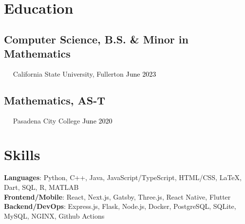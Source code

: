 \documentclass{article}
\newcommand{\resumesection}[3]{
    \subsection*{#1}
    \ 
    \ 
    \small
    \textcolor{csufgrey}{#2}
    \normalsize
    \hfill
    \textcolor{black}{#3}
    \normalsize
}
\begin{document}
\pagestyle{useheader}

\section*{Education}
\resumesection{Computer Science, B.S. \& Minor in Mathematics}{California State University, Fullerton}{June 2023}%
\resumesection{Mathematics, AS-T}{Pasadena City College}{June 2020}
\section*{Skills}
\textbf{Languages}: Python, C++, Java, JavaScript/TypeScript, HTML/CSS, {\selectfont\LaTeX}, Dart, SQL, R, MATLAB\\
\textbf{Frontend/Mobile}: React, Next.js, Gatsby, Three.js, React Native, Flutter\\
\textbf{Backend/DevOps}: Express.js, Flask, Node.js, Docker, PostgreSQL, SQLite, MySQL, NGINX, Github Actions
\end{document}
